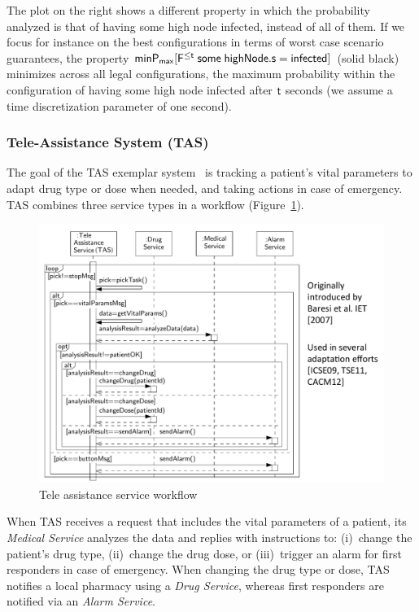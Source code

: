 \documentclass[10pt,journal,compsoc]{IEEEtran}
\begin{document}
The plot on the right shows a different property in which the probability analyzed is that of having some high node infected, instead of all of them. If we focus for instance on the best configurations in terms of worst case scenario guarantees, the property ${\sf minP_{max} [F^{\leq t} \; some \; highNode.s=infected]}$ (solid black) minimizes across all legal configurations, the maximum probability within the configuration of having some high node infected after ${\sf t}$ seconds (we assume a time discretization parameter of one second).



\subsubsection{Tele-Assistance System (TAS)}
\label{sec:tas}

The goal of the TAS exemplar system~\cite{DBLP:conf/icse/WeynsC15} is tracking a patient's vital parameters to adapt drug type or dose when needed, and taking actions in case of emergency.
TAS combines three service types in a workflow (Figure~\ref{fig:tas}).

\begin{figure}[!htbp]
    \centering
    \includegraphics[width=0.8\linewidth]{figures/taswf}    
    \caption{Tele assistance service workflow} %
    \label{fig:tas}      
\end{figure}

When TAS receives a request that includes the vital parameters of a patient, its {\em Medical Service} analyzes the data and replies with instructions to: (i)~change the patient's drug type, (ii)~change the drug dose, or (iii)~trigger an alarm for first responders in case of emergency.
When changing the drug type or dose, TAS notifies a local pharmacy using a {\em Drug Service}, whereas first responders are notified via an {\em Alarm Service}.
\end{document}
